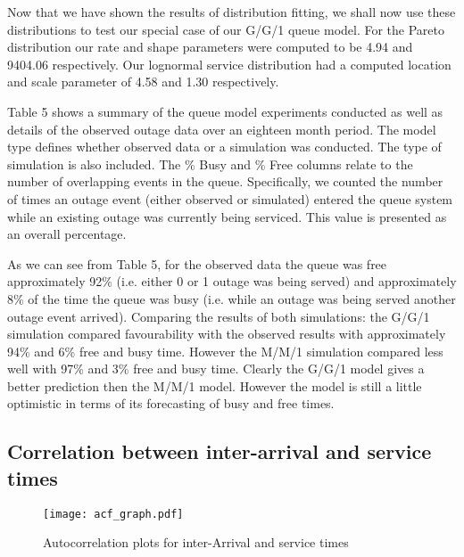 \documentclass[5p]{elsarticle}
\begin{document}
Now that we have shown the results of distribution fitting, we shall now use these distributions to test our special case of our G/G/1 queue model. For the Pareto distribution our rate and shape parameters were computed to be 4.94 and 9404.06 respectively. Our lognormal service distribution had a computed location and scale parameter of 4.58 and 1.30 respectively.

Table 5 shows a summary of the queue model experiments conducted as well as details of the observed outage data over an eighteen month period. The model type defines whether observed data or a simulation was conducted. The type of simulation is also included. The \% Busy and \% Free columns relate to the number of overlapping events in the queue. Specifically, we counted the number of times an outage event (either observed or simulated) entered the queue system while an existing outage was currently being serviced. This value is presented as an overall percentage. 

As we can see from Table 5, for the observed data the queue was free approximately 92\% (i.e. either 0 or 1 outage was being served) and approximately 8\% of the time the queue was busy (i.e. while an outage was being served another outage event arrived). Comparing the results of both simulations: the G/G/1 simulation compared favourability with the observed results with approximately 94\% and 6\% free and busy time. However the M/M/1 simulation compared less well with 97\% and 3\% free and busy time. Clearly the G/G/1 model gives a better prediction then the M/M/1 model. However the model is still a little optimistic in terms of its forecasting of busy and free times.

\subsection{Correlation between inter-arrival and service times}

\begin{figure*}[]
\begin{center}
\texttt{[image: acf\_graph.pdf]} 
\caption{Autocorrelation plots for inter-Arrival and service times}
\end{center}
\label{fig:acfgraphs}
\end{figure*}
\end{document}
